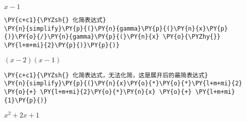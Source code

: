             
    
    $\displaystyle x - 1$

    

    \begin{tcolorbox}[breakable, size=fbox, boxrule=1pt, pad at break*=1mm,colback=cellbackground, colframe=cellborder]
\begin{Verbatim}[commandchars=\\\{\}]
\PY{c+c1}{\PYZsh{} 化简表达式}
\PY{n}{simplify}\PY{p}{(}\PY{n}{gamma}\PY{p}{(}\PY{n}{x}\PY{p}{)}\PY{o}{/}\PY{n}{gamma}\PY{p}{(}\PY{n}{x} \PY{o}{\PYZhy{}} \PY{l+m+mi}{2}\PY{p}{)}\PY{p}{)}
\end{Verbatim}
\end{tcolorbox}
 
            
    
    $\displaystyle \left(x - 2\right) \left(x - 1\right)$

    

    \begin{tcolorbox}[breakable, size=fbox, boxrule=1pt, pad at break*=1mm,colback=cellbackground, colframe=cellborder]
\begin{Verbatim}[commandchars=\\\{\}]
\PY{c+c1}{\PYZsh{} 化简表达式，无法化简，这是展开后的最简表达式}
\PY{n}{simplify}\PY{p}{(}\PY{n}{x}\PY{o}{*}\PY{o}{*}\PY{l+m+mi}{2} \PY{o}{+} \PY{l+m+mi}{2}\PY{o}{*}\PY{n}{x} \PY{o}{+} \PY{l+m+mi}{1}\PY{p}{)}
\end{Verbatim}
\end{tcolorbox}
 
            
    
    $\displaystyle x^{2} + 2 x + 1$
